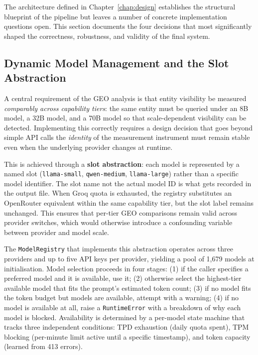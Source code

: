 The architecture defined in Chapter~\ref{chap:design} establishes the structural
blueprint of the pipeline but leaves a number of concrete implementation questions
open. This section documents the four decisions that most significantly shaped
the correctness, robustness, and validity of the final system.

\subsection{Dynamic Model Management and the Slot Abstraction}

A central requirement of the GEO analysis is that entity visibility be measured
\textit{comparably across capability tiers}: the same entity must be queried under
an 8B model, a 32B model, and a 70B model so that scale-dependent visibility can be
detected. Implementing this correctly requires a design decision that goes beyond
simple API calls  the \textit{identity} of the measurement instrument must remain
stable even when the underlying provider changes at runtime.

This is achieved through a \textbf{slot abstraction}: each model is represented by
a named slot (\texttt{llama-small}, \texttt{qwen-medium}, \texttt{llama-large})
rather than a specific model identifier. The slot name not the actual model ID is
what gets recorded in the output file. When Groq quota is exhausted, the registry
substitutes an OpenRouter equivalent within the same capability tier, but the slot
label remains unchanged. This ensures that per-tier GEO comparisons remain valid
across provider switches, which would otherwise introduce a confounding variable
between provider and model scale.

The \texttt{ModelRegistry} that implements this abstraction operates across three
providers and up to five API keys per provider, yielding a pool of 1,679 models at
initialisation. Model selection proceeds in four stages: (1) if the caller specifies
a preferred model and it is available, use it; (2) otherwise select the highest-tier
available model that fits the prompt's estimated token count; (3) if no model fits the
token budget but models are available, attempt with a warning; (4) if no model is
available at all, raise a \texttt{RuntimeError} with a breakdown of why each model is
blocked. Availability is determined by a per-model state machine that tracks three
independent conditions: TPD exhaustion (daily quota spent), TPM blocking (per-minute
limit active until a specific timestamp), and token capacity (learned from 413 errors).

